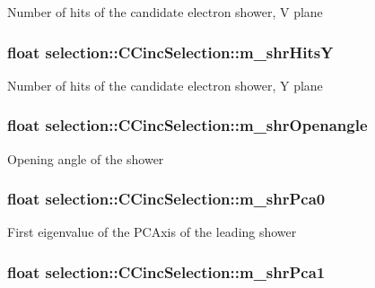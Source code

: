 Number of hits of the candidate electron shower, V plane \hypertarget{classselection_1_1CCincSelection_a5df838908bc1b3428f0c8c50209f4f0d}{
\subsubsection[{m\-\_\-shr\-Hits\-Y}]{\setlength{\rightskip}{0pt plus 5cm}float selection\-::\-C\-Cinc\-Selection\-::m\-\_\-shr\-Hits\-Y\hspace{0.3cm}{\ttfamily [private]}}}\label{classselection_1_1CCincSelection_a5df838908bc1b3428f0c8c50209f4f0d}
Number of hits of the candidate electron shower, Y plane \hypertarget{classselection_1_1CCincSelection_ab64b76c5254ccd50d06ffed8ec5e9eeb}{
\subsubsection[{m\-\_\-shr\-Openangle}]{\setlength{\rightskip}{0pt plus 5cm}float selection\-::\-C\-Cinc\-Selection\-::m\-\_\-shr\-Openangle\hspace{0.3cm}{\ttfamily [private]}}}\label{classselection_1_1CCincSelection_ab64b76c5254ccd50d06ffed8ec5e9eeb}
Opening angle of the shower \hypertarget{classselection_1_1CCincSelection_a219fd1d882087e6c3b2913f92ef1fa5c}{
\subsubsection[{m\-\_\-shr\-Pca0}]{\setlength{\rightskip}{0pt plus 5cm}float selection\-::\-C\-Cinc\-Selection\-::m\-\_\-shr\-Pca0\hspace{0.3cm}{\ttfamily [private]}}}\label{classselection_1_1CCincSelection_a219fd1d882087e6c3b2913f92ef1fa5c}
First eigenvalue of the P\-C\-Axis of the leading shower \hypertarget{classselection_1_1CCincSelection_a997abb8c3f3fb209e34be49f108111f0}{
\subsubsection[{m\-\_\-shr\-Pca1}]{\setlength{\rightskip}{0pt plus 5cm}float selection\-::\-C\-Cinc\-Selection\-::m\-\_\-shr\-Pca1\hspace{0.3cm}{\ttfamily [private]}}}\label{classselection_1_1CCincSelection_a997abb8c3f3fb209e34be49f108111f0}

